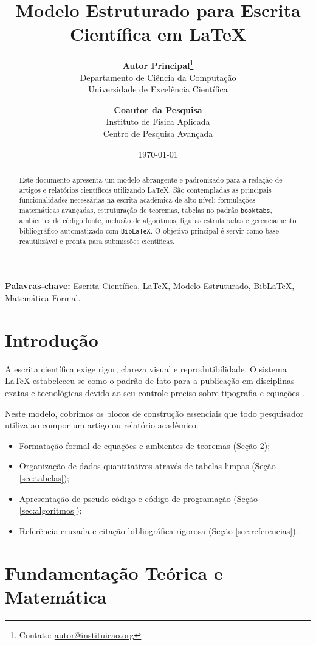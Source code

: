 \documentclass[11pt, a4paper]{article}
\title{\textbf{\Large Modelo Estruturado para Escrita Científica em {\LaTeX}}}
\author{
    \textbf{Autor Principal}\thanks{Contato: \href{mailto:autor@instituicao.org}{autor@instituicao.org}} \\
    \small Departamento de Ciência da Computação \\
    \small Universidade de Excelência Científica
    \and
    \textbf{Coautor da Pesquisa} \\
    \small Instituto de Física Aplicada \\
    \small Centro de Pesquisa Avançada
}
\date{\today}
\theoremstyle{definition}
\theoremstyle{remark}
\begin{document}
\maketitle

\begin{abstract}
Este documento apresenta um modelo abrangente e padronizado para a redação de artigos e relatórios científicos utilizando {\LaTeX}. São contempladas as principais funcionalidades necessárias na escrita acadêmica de alto nível: formulações matemáticas avançadas, estruturação de teoremas, tabelas no padrão \texttt{booktabs}, ambientes de código fonte, inclusão de algoritmos, figuras estruturadas e gerenciamento bibliográfico automatizado com \texttt{BibLaTeX}. O objetivo principal é servir como base reautilizável e pronta para submissões científicas.
\end{abstract}

\textbf{Palavras-chave:} Escrita Científica, {\LaTeX}, Modelo Estruturado, BibLaTeX, Matemática Formal.

\section{Introdução}
\label{sec:introducao}

A escrita científica exige rigor, clareza visual e reprodutibilidade. O sistema {\LaTeX} estabeleceu-se como o padrão de fato para a publicação em disciplinas exatas e tecnológicas devido ao seu controle preciso sobre tipografia e equações \cite{knuth1984}.

Neste modelo, cobrimos os blocos de construção essenciais que todo pesquisador utiliza ao compor um artigo ou relatório acadêmico:
\begin{itemize}
    \item Formatação formal de equações e ambientes de teoremas (Seção \ref{sec:matematica});
    \item Organização de dados quantitativos através de tabelas limpas (Seção \ref{sec:tabelas});
    \item Apresentação de pseudo-código e código de programação (Seção \ref{sec:algoritmos});
    \item Referência cruzada e citação bibliográfica rigorosa (Seção \ref{sec:referencias}).
\end{itemize}

\section{Fundamentação Teórica e Matemática}
\label{sec:matematica}
\end{document}
